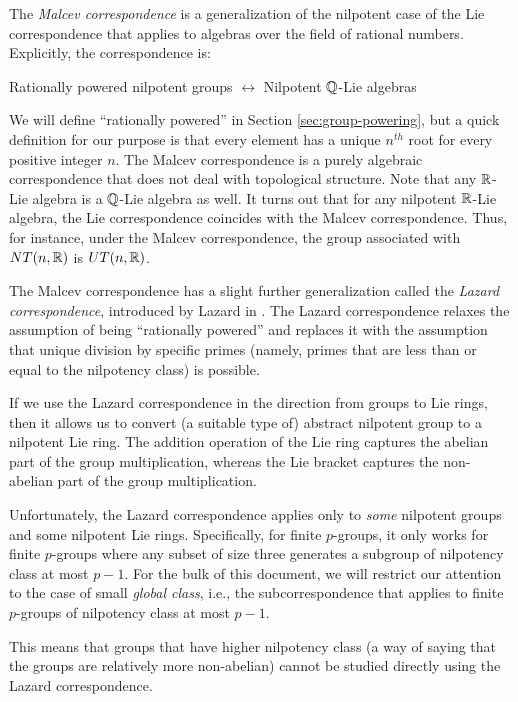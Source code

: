 The {\em Malcev correspondence} is a generalization of the nilpotent
case of the Lie correspondence that applies to algebras over the field
of rational numbers. Explicitly, the correspondence is:

\begin{center}
  Rationally powered nilpotent groups $\leftrightarrow$ Nilpotent $\mathbb{Q}$-Lie algebras
\end{center}

We will define ``rationally powered'' in Section
\ref{sec:group-powering}, but a quick definition for our purpose is
that every element has a unique $n^{th}$ root for every positive
integer $n$. The Malcev correspondence is a purely algebraic
correspondence that does not deal with topological structure. Note
that any $\mathbb{R}$-Lie algebra is a $\mathbb{Q}$-Lie algebra as well. It turns out
that for any nilpotent $\mathbb{R}$-Lie algebra, the Lie correspondence
coincides with the Malcev correspondence. Thus, for instance, under
the Malcev correspondence, the group associated with $NT(n,\mathbb{R})$ is
$UT(n,\mathbb{R})$.

The Malcev correspondence has a slight further generalization called
the {\em Lazard correspondence}, introduced by Lazard in
\cite{Lazardsoriginal}. The Lazard correspondence relaxes the
  assumption of being ``rationally powered'' and replaces it with the
  assumption that unique division by specific primes (namely, primes
  that are less than or equal to the nilpotency class) is possible.

If we use the Lazard correspondence in the direction from groups to
Lie rings, then it allows us to convert (a suitable type of) abstract
nilpotent group to a nilpotent Lie ring. The addition operation of the
Lie ring captures the abelian part of the group multiplication,
whereas the Lie bracket captures the non-abelian part of the group
multiplication.

Unfortunately, the Lazard correspondence applies only to {\em some}
nilpotent groups and some nilpotent Lie rings. Specifically, for
finite $p$-groups, it only works for finite $p$-groups where any
subset of size three generates a subgroup of nilpotency class at most
$p - 1$. For the bulk of this document, we will restrict our attention
to the case of small {\em global class}, i.e., the subcorrespondence
that applies to finite $p$-groups of nilpotency class at most $p - 1$.

This means that groups that have higher nilpotency class (a
way of saying that the groups are relatively more non-abelian) cannot
be studied directly using the Lazard correspondence.

